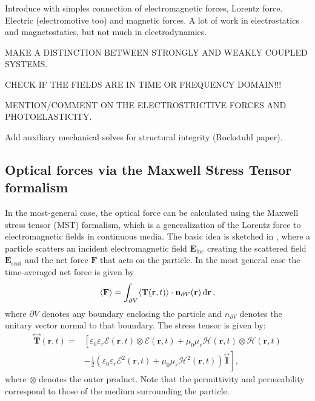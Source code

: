 Introduce with simples connection of electromagnetic forces, Lorentz force. Electric (electromotive too) and 
magnetic forces. A lot of work in electrostatics and magnetostatics, but not much in
electrodynamics.

MAKE A DISTINCTION BETWEEN STRONGLY AND WEAKLY COUPLED SYSTEMS.

CHECK IF THE FIELDS ARE IN TIME OR FREQUENCY DOMAIN!!!

MENTION/COMMENT ON THE ELECTROSTRICTIVE FORCES AND PHOTOELASTICITY.

Add auxiliary mechanical solves for structural integrity (Rockstuhl paper).

\subsection*{Optical forces via the Maxwell Stress Tensor formalism \cite{ownpub3}}

In the most-general case, the optical force can be calculated using the Maxwell stress tensor (MST) formalism, which is a generalization of the Lorentz force to electromagnetic fields in continuous media.
The basic idea is sketched in , where
a particle scatters an incident electromagnetic field $\mathbf{E}_\text{inc}$ creating the scattered field $\mathbf{E}_\text{scat}$ and the net force $\mathbf{F}$ that acts
on the particle. In the most general case the time-averaged net force is given by
\begin{equation}
    \langle\mathbf{F}\rangle=\int_{\partial V}\langle\mathbf{T}(\mathbf{r}, t)\rangle \cdot \mathbf{n}_{\partial V}(\mathbf{r}) \mathop{}\!\text{d} \mathbf{r}\,,
\end{equation}
where $\partial V$ denotes any boundary enclosing the particle and $n_{\partial V}$ denotes the unitary vector normal to that boundary.
The stress tensor is given by:
\begin{equation}
    \begin{aligned}
    \stackrel{\leftrightarrow}{\mathbf{T}}(\mathbf{r}, t)= & {\left[\varepsilon_0 \varepsilon_r \mathcal{E}(\mathbf{r}, t) \otimes \mathcal{E}(\mathbf{r}, t)+\mu_0 \mu_r \mathcal{H}(\mathbf{r}, t) \otimes \mathcal{H}(\mathbf{r}, t)\right.} \\
    & \left.-\frac{1}{2}\left(\varepsilon_0 \varepsilon_r \mathcal{E}^2(\mathbf{r}, t)+\mu_0 \mu_r \mathcal{H}^2(\mathbf{r}, t)\right) \stackrel{\leftrightarrow}{\mathbf{I}}\right],
    \end{aligned}
\end{equation}
where $\otimes$ denotes the outer product. Note that the permittivity and permeability correspond to those of the medium surrounding the particle.


